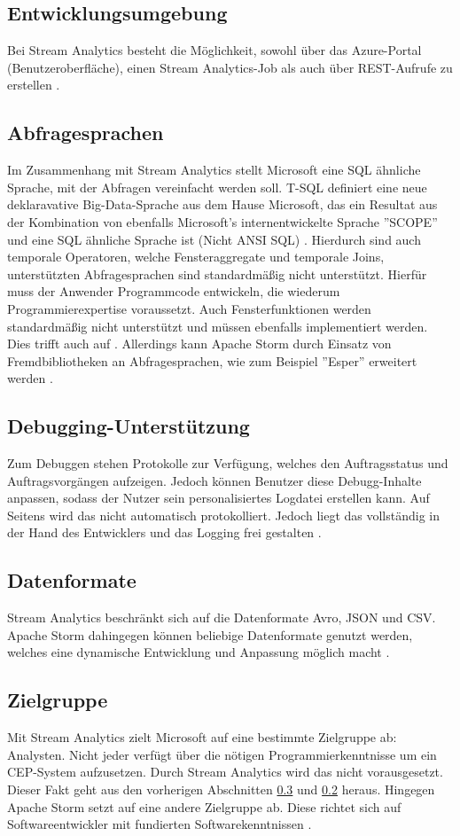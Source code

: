 \subsection{Entwicklungsumgebung}
Bei Stream Analytics besteht die Möglichkeit, sowohl über das Azure-Portal (Benutzeroberfläche), einen Stream Analytics-Job als auch über REST-Aufrufe zu erstellen \cite{jeffstokes72.19.12.2017} \cite{samacha.19.12.2017}. 

\subsection{Abfragesprachen} \label{absprache}
Im Zusammenhang mit Stream Analytics stellt Microsoft eine SQL ähnliche Sprache, mit der Abfragen vereinfacht werden soll. T-SQL definiert eine neue deklaravative Big-Data-Sprache aus dem Hause Microsoft, das ein Resultat aus der Kombination von ebenfalls Microsoft’s internentwickelte Sprache ''SCOPE'' und eine SQL ähnliche Sprache ist (Nicht ANSI SQL) \cite{sql.2016}. Hierdurch sind auch temporale Operatoren, welche Fensteraggregate und temporale Joins, unterstützten  Abfragesprachen sind standardmäßig nicht unterstützt. Hierfür muss der Anwender Programmcode entwickeln, die wiederum Programmierexpertise voraussetzt. Auch Fensterfunktionen werden standardmäßig nicht unterstützt und müssen ebenfalls implementiert werden. Dies trifft auch auf  \cite{samacha.2017}. Allerdings kann Apache Storm durch Einsatz von Fremdbibliotheken an Abfragesprachen, wie zum Beispiel ''Esper'' erweitert werden \cite{esper.2016}.

\subsection{Debugging-Unterstützung} \label{Debugging}
Zum Debuggen stehen Protokolle zur Verfügung, welches den Auftragsstatus und Auftragsvorgängen aufzeigen. Jedoch können Benutzer diese Debugg-Inhalte anpassen, sodass der Nutzer sein personalisiertes Logdatei erstellen kann. Auf Seitens wird das nicht automatisch protokolliert. Jedoch liegt das vollständig in der Hand des Entwicklers und das Logging frei gestalten \cite{apachedebugging.2106}.


\subsection{Datenformate}
Stream Analytics beschränkt sich auf die Datenformate Avro, JSON und CSV. Apache Storm dahingegen können beliebige Datenformate genutzt werden, welches eine dynamische Entwicklung und Anpassung möglich macht \cite{Klein.2017}. 

\subsection{Zielgruppe}
Mit Stream Analytics zielt Microsoft auf eine bestimmte Zielgruppe ab: Analysten. Nicht jeder verfügt über die nötigen Programmierkenntnisse um ein CEP-System aufzusetzen. Durch Stream Analytics wird das nicht vorausgesetzt. Dieser Fakt geht aus den vorherigen Abschnitten \ref{Debugging} und \ref{absprache} heraus. Hingegen Apache Storm setzt auf eine andere Zielgruppe ab. Diese richtet sich auf Softwareentwickler mit fundierten Softwarekenntnissen \cite{Familiar.2017}. 
